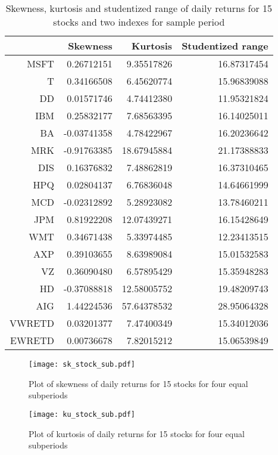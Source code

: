 \documentclass[11pt]{article}
\begin{document}
\begin{table}
\centering
\begin{tabular}{rrrr}
  \hline
 & Skewness & Kurtosis & Studentized range \\ 
  \hline
MSFT & 0.26712151 & 9.35517826 & 16.87317454 \\ 
  T & 0.34166508 & 6.45620774 & 15.96839088 \\ 
  DD & 0.01571746 & 4.74412380 & 11.95321824 \\ 
  IBM & 0.25832177 & 7.68563395 & 16.14025011 \\ 
  BA & -0.03741358 & 4.78422967 & 16.20236642 \\ 
  MRK & -0.91763385 & 18.67945884 & 21.17388833 \\ 
  DIS & 0.16376832 & 7.48862819 & 16.37310465 \\ 
  HPQ & 0.02804137 & 6.76836048 & 14.64661999 \\ 
  MCD & -0.02312892 & 5.28923082 & 13.78460211 \\ 
  JPM & 0.81922208 & 12.07439271 & 16.15428649 \\ 
  WMT & 0.34671438 & 5.33974485 & 12.23413515 \\ 
  AXP & 0.39103655 & 8.63989084 & 15.01532583 \\ 
  VZ & 0.36090480 & 6.57895429 & 15.35948283 \\ 
  HD & -0.37088818 & 12.58005752 & 19.48209743 \\ 
  AIG & 1.44224536 & 57.64378532 & 28.95064328 \\ 
  VWRETD & 0.03201377 & 7.47400349 & 15.34012036 \\ 
  EWRETD & 0.00736678 & 7.82015212 & 15.06539849 \\ 
   \hline
\end{tabular}
\caption{Skewness, kurtosis and studentized range of daily returns for 15 stocks and two indexes for sample period}\label{tab3}
\end{table}

\begin{figure}
\centering
\texttt{[image: sk\_stock\_sub.pdf]}
\caption{Plot of skewness of daily returns for 15 stocks for four equal subperiods }
\label{skstocksub}
\end{figure}

\begin{figure}
\centering
\texttt{[image: ku\_stock\_sub.pdf]}
\caption{Plot of kurtosis of daily returns for 15 stocks for four equal subperiods }
\label{kustocksub}
\end{figure}
\end{document}
